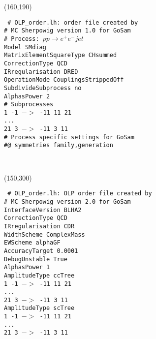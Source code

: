 \begin{figure}[h]
\begin{center}
\framebox(160,190){%
    \parbox{150\unitlength}{\tt\scriptsize
\# OLP\_order.lh: order file created by \\
\# MC Sherpowig version 1.0 for GoSam\\
\# Process: $p p \to e^+ e^- jet$\\
Model                    SMdiag\\
MatrixElementSquareType  CHsummed\\
CorrectionType           QCD\\
IRregularisation         DRED\\
OperationMode            CouplingsStrippedOff\\
SubdivideSubprocess      no\\
AlphasPower              2\\
\# Subprocesses \\
1 -1 $->$ -11 11 21\\ 
...\\
21 3 $->$ -11 3 11 \\
\# Process specific settings for GoSam\\
\#@ symmetries family,generation}
}
\parbox{5\unitlength}{\ }\framebox(150,300){%
    \parbox{150\unitlength}{\tt\scriptsize
\#  OLP\_order.lh: OLP order file created by \\
\# MC Sherpowig version 2.0 for GoSam\\
InterfaceVersion         BLHA2\\
CorrectionType           QCD\\
IRregularisation         CDR\\
WidthScheme              ComplexMass\\
EWScheme                 alphaGF\\
AccuracyTarget           0.0001\\
DebugUnstable            True\\

AlphasPower              1\\
AmplitudeType ccTree\\
1 -1 $->$ -11 11 21 \\
...\\
21 3 $->$ -11 3 11 \\

AmplitudeType scTree\\
1 -1 $->$ -11 11 21\\ 
...\\ 
21 3 $->$ -11 3 11 \\

}}
\end{center}
\end{figure}
